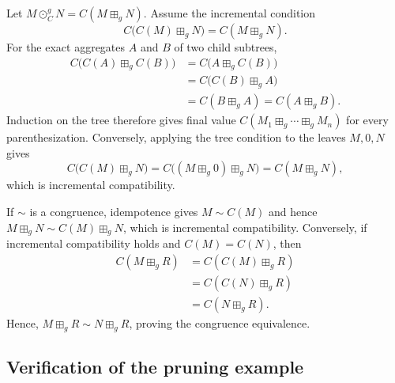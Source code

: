 \documentclass[runningheads]{llncs}
\begin{document}
Let $M\odot_C^gN=C(M\boxplus_gN)$. Assume the incremental condition
\begin{equation*}
 C\bigl(C(M)\boxplus_gN\bigr)=C(M\boxplus_gN).
\end{equation*}
For the exact aggregates $A$ and $B$ of two child subtrees,
\begin{align*}
 C\bigl(C(A)\boxplus_gC(B)\bigr)
 &=C\bigl(A\boxplus_gC(B)\bigr)\\
 &=C\bigl(C(B)\boxplus_gA\bigr)\\
 &=C(B\boxplus_gA)=C(A\boxplus_gB).
\end{align*}
Induction on the tree therefore gives final value
$C(M_1\boxplus_g\cdots\boxplus_gM_n)$ for every parenthesization. Conversely, applying the
tree condition to the leaves $M,0,N$ gives
\begin{equation*}
 C\bigl(C(M)\boxplus_gN\bigr)
 =C\bigl((M\boxplus_g0)\boxplus_gN\bigr)
 =C(M\boxplus_gN),
\end{equation*}
which is incremental compatibility.

If $\sim$ is a congruence, idempotence gives $M\sim C(M)$ and hence
$M\boxplus_gN\sim C(M)\boxplus_gN$, which is incremental compatibility.
Conversely, if incremental compatibility holds and $C(M)=C(N)$, then
\begin{align*}
 C(M\boxplus_gR)
 &=C(C(M)\boxplus_gR)\\
 &=C(C(N)\boxplus_gR)\\
 &=C(N\boxplus_gR).
\end{align*}
Hence, $M\boxplus_gR\sim N\boxplus_gR$, proving the congruence equivalence.



\subsection*{Verification of the pruning example}
\end{document}

